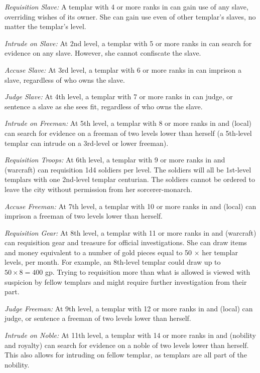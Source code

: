\textit{Requisition Slave:} A templar with 4 or more ranks in  can gain use of any slave, overriding wishes of its owner. She can gain use even of other templar's slaves, no matter the templar's level.

\textit{Intrude on Slave:} At 2nd level, a templar with 5 or more ranks in  can search for evidence on any slave. However, she cannot confiscate the slave.

\textit{Accuse Slave:} At 3rd level, a templar with 6 or more ranks in  can imprison a slave, regardless of who owns the slave.

\textit{Judge Slave:} At 4th level, a templar with 7 or more ranks in  can judge, or sentence a slave as she sees fit, regardless of who owns the slave.

\textit{Intrude on Freeman:} At 5th level, a templar with 8 or more ranks in  and  (local) can search for evidence on a freeman of two levels lower than herself (a 5th-level templar can intrude on a 3rd-level or lower freeman).

\textit{Requisition Troops:} At 6th level, a templar with 9 or more ranks in  and  (warcraft) can requisition 1d4 soldiers per level. The soldiers will all be 1st-level templars with one 2nd-level templar centurian. The soldiers cannot be ordered to leave the city without permission from her sorcerer-monarch.

\textit{Accuse Freeman:} At 7th level, a templar with 10 or more ranks in  and  (local) can imprison a freeman of two levels lower than herself.

\textit{Requisition Gear:} At 8th level, a templar with 11 or more ranks in  and  (warcraft) can requisition gear and treasure for official investigations. She can draw items and money equivalent to a number of gold pieces equal to 50 $\times$ her templar levels, per month. For example, an 8th-level templar could draw up to $50\times8=400$ gp. Trying to requisition more than what is allowed is viewed with suspicion by fellow templars and might require further investigation from their part.

\textit{Judge Freeman:} At 9th level, a templar with 12 or more ranks in  and  (local) can judge, or sentence a freeman of two levels lower than herself.

\textit{Intrude on Noble:} At 11th level, a templar with 14 or more ranks in  and  (nobility and royalty) can search for evidence on a noble of two levels lower than herself. This also allows for intruding on fellow templar, as templars are all part of the nobility.

